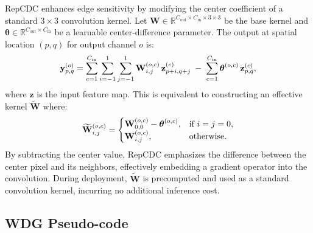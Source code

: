 \documentclass{article}
\theoremstyle{plain}
\theoremstyle{definition}
\theoremstyle{remark}
\begin{document}
RepCDC enhances edge sensitivity by modifying the center coefficient of a standard $3{\times}3$ convolution kernel. Let $\mathbf{W} \in \mathbb{R}^{C_{\mathrm{out}} \times C_{\mathrm{in}} \times 3 \times 3}$ be the base kernel and $\boldsymbol{\theta} \in \mathbb{R}^{C_{\mathrm{out}} \times C_{\mathrm{in}}}$ be a learnable center-difference parameter. The output at spatial location $(p,q)$ for output channel $o$ is:
\vspace{-0.2cm}
\begin{equation}
\label{eq:wdg_repcdc_appendix}
\mathbf{y}^{(o)}_{p,q} = \sum_{c=1}^{C_{\mathrm{in}}}\sum_{i=-1}^{1}\sum_{j=-1}^{1} \mathbf{W}^{(o,c)}_{i,j}\,\mathbf{z}^{(c)}_{p+i,q+j} \;-\; \sum_{c=1}^{C_{\mathrm{in}}} \boldsymbol{\theta}^{(o,c)}\,\mathbf{z}^{(c)}_{p,q},
\vspace{-0.2cm}
\end{equation}
where $\mathbf{z}$ is the input feature map. This is equivalent to constructing an effective kernel $\widetilde{\mathbf{W}}$ where:
\vspace{-0.2cm}
\begin{equation}
\widetilde{\mathbf{W}}^{(o,c)}_{i,j} = 
\begin{cases}
\mathbf{W}^{(o,c)}_{0,0} - \boldsymbol{\theta}^{(o,c)}, & \text{if } i=j=0, \\
\mathbf{W}^{(o,c)}_{i,j}, & \text{otherwise}.
\end{cases}
\vspace{-0.2cm}
\end{equation}
By subtracting the center value, RepCDC emphasizes the difference between the center pixel and its neighbors, effectively embedding a gradient operator into the convolution. During deployment, $\widetilde{\mathbf{W}}$ is precomputed and used as a standard convolution kernel, incurring no additional inference cost.

\subsection{WDG Pseudo-code}
\end{document}
